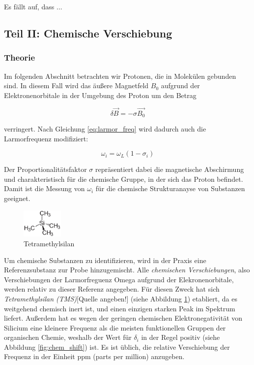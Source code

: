 \documentclass[a4paper]{scrartcl} %
\begin{document}
Es fällt auf, dass ...

\newpage

\subsection{Teil II: Chemische Verschiebung}

\subsubsection{Theorie}

Im folgenden Abschnitt betrachten wir Protonen, die in Molekülen gebunden sind. In diesem Fall wird das äußere Magnetfeld $B_0$ aufgrund der Elektronenorbitale in der Umgebung des Proton um den Betrag

\begin{equation}
	\delta \vec{B} = - \sigma \vec{B_0}
	\label{eq:delta_B}
\end{equation}

verringert. Nach Gleichung \eqref{eq:larmor_freq} wird dadurch auch die Larmorfrequenz modifiziert:

\begin{equation}
	\omega_i = \omega_L \left(1-\sigma_i \right)
	\label{eq:omega_i}
\end{equation}

Der Proportionalitätsfaktor $\sigma$ repräsentiert dabei die magnetische Abschirmung und charakteristisch für die chemische Gruppe, in der sich das Proton befindet. Damit ist die Messung von $\omega_i$ für die chemische Strukturanayse von Substanzen geeignet. 

\begin{figure}
	\begin{center}
		\includegraphics[width = 0.18\textwidth]{./Resources/Tetramethylsilan.png}
	\end{center}
	\caption{Te\-tramethylsilan}
	\label{fig:TMS}
\end{figure}

Um chemische Substanzen zu identifizieren, wird in der Praxis eine Referenzsubstanz zur Probe hinzugemischt. Alle \emph{chemischen Verschiebungen}, also Verschiebungen der Larmorfreguenz Omega aufgrund der Elekronenorbitale, werden relativ zu dieser Referenz angegeben. Für diesen Zweck hat sich \emph{Tetramethylsilan (TMS)}[Quelle angeben!] (siehe Abbildung \ref{fig:TMS}) etabliert, da es weitgehend chemisch inert ist, und einen einzigen starken Peak im Spektrum liefert. Außerdem hat es wegen der geringen chemischen Elektronegativität von Silicium eine kleinere Frequenz als die meisten funktionellen Gruppen der organischen Chemie, weshalb der Wert für $\delta_i$ in der Regel positiv (siehe Abbildung \ref{fig:chem_shift}) ist. Es ist üblich, die relative Verschiebung der Frequenz in der Einheit ppm (parts per million) anzugeben.
\end{document}
